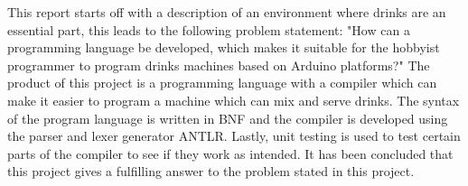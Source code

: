 This report starts off with a description of an environment where drinks are an essential part, this leads to the following problem statement:
"How can a programming language be developed, which makes it suitable for the hobbyist programmer to program drinks machines based on Arduino platforms?"
The product of this project is a programming language with a compiler which can make it easier to program a machine which can mix and serve drinks. The syntax of the program language is written in BNF and the compiler is developed using the parser and lexer generator ANTLR. Lastly, unit testing is used to test certain parts of the compiler to see if they work as intended. It has been concluded that this project gives a fulfilling answer to the problem stated in this project.